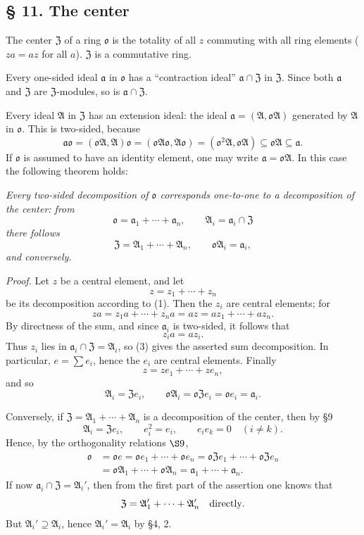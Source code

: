 \documentclass[11pt]{article}
\providecommand{\mA}{\mathfrak{A}}
\providecommand{\mo}{\mathfrak{o}}
\providecommand{\ma}{\mathfrak{a}}
\providecommand{\mZ}{\mathfrak{Z}}
\begin{document}
\subsection*{§ 11. The center}

The center $\mZ$ of a ring $\mo$ is the totality of all $z$ commuting with all ring elements ($za=az$ for all $a$). $\mZ$ is a commutative ring.

Every one-sided ideal $\ma$ in $\mo$ has a ``contraction ideal'' $\ma\cap\mZ$ in $\mZ$. Since both $\ma$ and $\mZ$ are $\mZ$-modules, so is $\ma\cap\mZ$.

Every ideal $\mA$ in $\mZ$ has an extension ideal: the ideal $\ma=(\mA,\mo\mA)$ generated by $\mA$ in $\mo$. This is two-sided, because
\[
        \ma\mo=(\mo\mA,\mA)\mo=(\mo\mA\mo,\mA\mo)
        = (\mo^2\mA,\mo\mA)\subseteq \mo\mA\subseteq\ma.
\]
If $\mo$ is assumed to have an identity element, one may write $\ma=\mo\mA$. In this case the following theorem holds:

\emph{Every two-sided decomposition of $\mo$ corresponds one-to-one to a decomposition of the center: from}
\begin{equation}
        \mo=\ma_1+\cdots+\ma_n,
        \qquad \mA_i=\ma_i\cap\mZ                         \tag{1}
\end{equation}
\emph{there follows}
\begin{equation}
        \mZ=\mA_1+\cdots+\mA_n,
        \qquad \mo\mA_i=\ma_i,                              \tag{2}
\end{equation}
\emph{and conversely.}

\emph{Proof.} Let $z$ be a central element, and let
\begin{equation}
        z=z_1+\cdots+z_n                                    \tag{3}
\end{equation}
be its decomposition according to (1). Then the $z_i$ are central elements; for
\[
        za=z_1a+\cdots+z_na=az=az_1+\cdots+az_n.
\]
By directness of the sum, and since $\ma_i$ is two-sided, it follows that
\[
        z_i a=az_i.
\]
Thus $z_i$ lies in $\ma_i\cap\mZ=\mA_i$, so (3) gives the asserted sum decomposition. In particular, $e=\sum e_i$, hence the $e_i$ are central elements. Finally
\[
        z=ze_1+\cdots+ze_n,
\]
and so
\[
        \mA_i=\mZ e_i,
        \qquad
        \mo\mA_i=\mo\mZ e_i=\mo e_i=\ma_i.
\]

Conversely, if $\mZ=\mA_1+\cdots+\mA_n$ is a decomposition of the center, then by §9
\[
        \mA_i=\mZ e_i,
        \qquad e_i^2=e_i,
        \qquad e_i e_k=0\quad(i\ne k).
\]
Hence, by the orthogonality relations \hbox{\(\S 9\)},
\[
\begin{aligned}
        \mo&=\mo e=\mo e_1+\cdots+\mo e_n
        =\mo\mZ e_1+\cdots+\mo\mZ e_n\\
        &=\mo\mA_1+\cdots+\mo\mA_n
        =\ma_1+\cdots+\ma_n .
\end{aligned}
\]
If now $\ma_i\cap\mZ=\mA_i'$, then from the first part of the assertion one knows that
\[
        \mZ=\mA_1'+\cdots+\mA_n'\quad\hbox{directly}.
\]
But $\mA_i'\supseteq\mA_i$, hence $\mA_i'=\mA_i$ by §4, 2.
\end{document}
